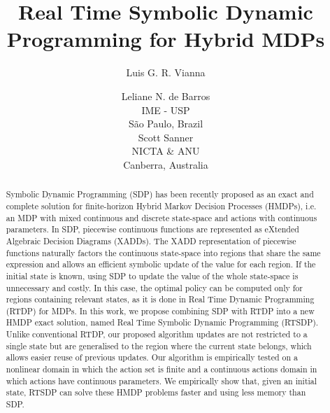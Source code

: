 \documentclass[letterpaper]{article}
\title{Real Time Symbolic Dynamic Programming for Hybrid MDPs}
\author{
Luis G. R. Vianna \and Leliane N. de Barros\\
IME - USP\\
S\~ao Paulo, Brazil\\
\And
Scott Sanner\\
NICTA \& ANU\\
Canberra, Australia}
\begin{document}
\maketitle

\begin{abstract}

Symbolic Dynamic Programming (SDP) has been recently proposed as an exact and complete solution for finite-horizon Hybrid Markov Decision Processes (HMDPs), i.e. an MDP with mixed continuous and discrete state-space and actions with continuous parameters.
In SDP, piecewise continuous functions are represented as eXtended Algebraic Decision Diagrams (XADDs).
The XADD representation of piecewise functions naturally factors the continuous state-space into regions that share the same expression and allows an efficient symbolic update of the value for each region.
If the initial state is known, using SDP to update the value of the whole state-space is unnecessary and costly.
In this case, the optimal policy can be computed only for regions containing relevant states, as it is done in Real Time Dynamic Programming (RTDP) for MDPs. 
In this work, we propose combining SDP with RTDP into a new HMDP exact solution, named Real Time Symbolic Dynamic Programming (RTSDP).
Unlike conventional RTDP, our proposed algorithm updates are not restricted to a single state but are generalised to the  region where the current state belongs, which allows easier reuse of previous updates.
Our algorithm is empirically tested on a nonlinear domain in which the action set is finite and a continuous actions domain in which actions have continuous parameters.
We empirically show that, given an initial state, RTSDP can solve these HMDP problems faster and using less memory than SDP.
\end{abstract}
\end{document}
